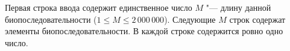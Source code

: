 Первая строка ввода содержит единственное число $M$ "--- длину данной
биопоследовательности ($1 \leq M \leq 2\,000\,000$).
Следующие $M$ строк содержат элементы биопоследовательности.
В каждой строке содержится ровно одно число.


